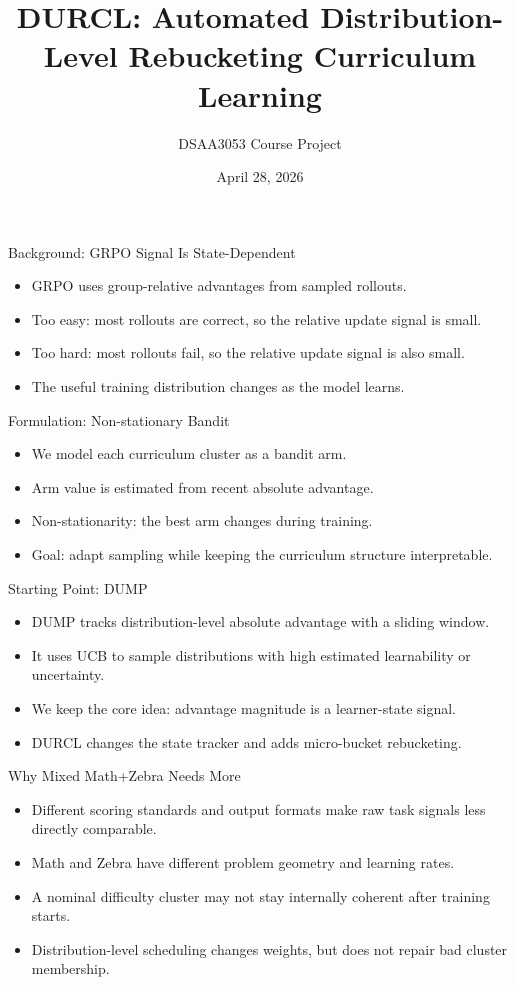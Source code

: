 \documentclass[aspectratio=169]{beamer}
\title{DURCL: Automated Distribution-Level Rebucketing Curriculum Learning}
\author{DSAA3053 Course Project}
\date{April 28, 2026}
\begin{document}
\begin{frame}
  \titlepage
\end{frame}

\begin{frame}{Background: GRPO Signal Is State-Dependent}
  \begin{itemize}
    \item GRPO uses group-relative advantages from sampled rollouts.
    \item Too easy: most rollouts are correct, so the relative update signal is small.
    \item Too hard: most rollouts fail, so the relative update signal is also small.
    \item The useful training distribution changes as the model learns.
  \end{itemize}
\end{frame}

\begin{frame}{Formulation: Non-stationary Bandit}
  \begin{itemize}
    \item We model each curriculum cluster as a bandit arm.
    \item Arm value is estimated from recent absolute advantage.
    \item Non-stationarity: the best arm changes during training.
    \item Goal: adapt sampling while keeping the curriculum structure interpretable.
  \end{itemize}
\end{frame}

\begin{frame}{Starting Point: DUMP}
  \begin{itemize}
    \item DUMP tracks distribution-level absolute advantage with a sliding window.
    \item It uses UCB to sample distributions with high estimated learnability or uncertainty.
    \item We keep the core idea: advantage magnitude is a learner-state signal.
    \item DURCL changes the state tracker and adds micro-bucket rebucketing.
  \end{itemize}
\end{frame}

\begin{frame}{Why Mixed Math+Zebra Needs More}
  \begin{itemize}
    \item Different scoring standards and output formats make raw task signals less directly comparable.
    \item Math and Zebra have different problem geometry and learning rates.
    \item A nominal difficulty cluster may not stay internally coherent after training starts.
    \item Distribution-level scheduling changes weights, but does not repair bad cluster membership.
  \end{itemize}
\end{frame}
\end{document}
